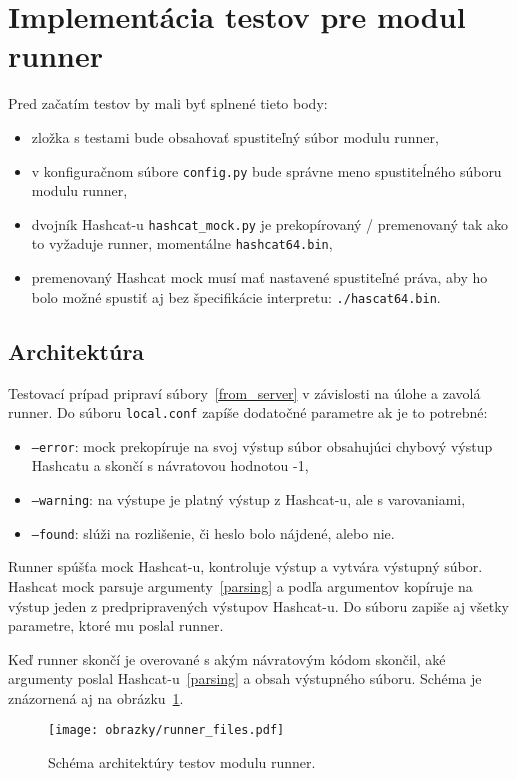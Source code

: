 \section{Implementácia testov pre modul runner}
\label{impl_runner}
Pred začatím testov by mali byť splnené tieto body:
\begin{itemize}
	\item zložka s testami bude obsahovať spustiteľný súbor modulu runner,
	\item v konfiguračnom súbore \texttt{config.py} bude správne meno spustiteĺného súboru modulu runner,
	\item dvojník Hashcat-u \texttt{hashcat\_mock.py} je prekopírovaný / premenovaný tak ako to vyžaduje runner, momentálne \texttt{hashcat64.bin},
	\item premenovaný Hashcat mock musí mať nastavené spustiteľné práva, aby ho bolo možné spustiť aj bez špecifikácie interpretu: \texttt{./hascat64.bin}.
\end{itemize}

\subsection*{Architektúra}
Testovací prípad pripraví súbory~\ref{from_server} v závislosti na úlohe a zavolá runner.
Do súboru \texttt{local.conf} zapíše dodatočné parametre ak je to potrebné:
\begin{itemize}
	\item \texttt{--error}: mock prekopíruje na svoj výstup súbor obsahujúci chybový výstup Hashcatu a skončí s návratovou hodnotou -1,
	\item \texttt{--warning}: na výstupe je platný výstup z Hashcat-u, ale s varovaniami,
	\item \texttt{--found}: slúži na rozlišenie, či heslo bolo nájdené, alebo nie.
\end{itemize}
Runner spúšťa mock Hashcat-u, kontroluje výstup a vytvára výstupný súbor.
Hashcat mock parsuje argumenty~\ref{parsing} a podľa argumentov kopíruje na výstup jeden z predpripravených výstupov Hashcat-u.
Do súboru zapiše aj všetky parametre, ktoré mu poslal runner.

Keď runner skončí je overované s akým návratovým kódom skončil, aké argumenty poslal Hashcat-u~\ref{parsing} a obsah výstupného súboru.
Schéma je znázornená aj na obrázku~\ref{fig:runner_files}.

\begin{figure}[h]
	\centering
	\texttt{[image: obrazky/runner\_files.pdf]}
	\caption{Schéma architektúry testov modulu runner.}
	\label{fig:runner_files}
\end{figure}

